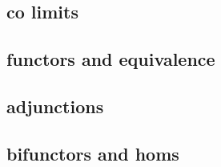 \subsection{co limits}














\subsection{functors and equivalence}




\subsection{adjunctions}







\subsection{bifunctors and homs}







